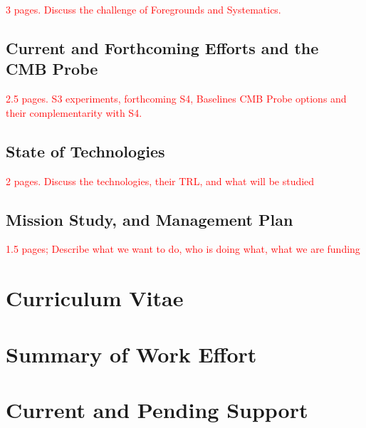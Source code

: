 \documentclass[12pt]{article}
\newcommand{\comred}[1]{\textcolor{red}{#1}}
\begin{document}
\comred{3 pages. Discuss the challenge of Foregrounds and Systematics. }
\subsection{Current and Forthcoming Efforts and the CMB Probe}
\label{sec:spacemission}

\vspace{-0.05in}

\comred{2.5 pages. S3 experiments, forthcoming S4, Baselines CMB Probe options and their complementarity with S4.}
\vspace{-0.22in}

\subsection{State of Technologies}
\label{sec:technologies}

\vspace{-0.05in}

\comred{2 pages. Discuss the technologies, their TRL, and what will be studied }

\vspace{-0.22in}

\subsection{Mission Study, and Management Plan  }
\label{sec:management}

\vspace{-0.05in}

\comred{1.5 pages; Describe what we want to do, who is doing what, what we are funding}

\newpage



\newpage
\section{Curriculum Vitae}
\label{sec:cv}

\newpage
\addtocounter{page}{8}
\section{Summary of Work Effort}
\label{sec:workeffort}



\section{Current and Pending Support}
\label{sec:current_and_pending}
\end{document}
